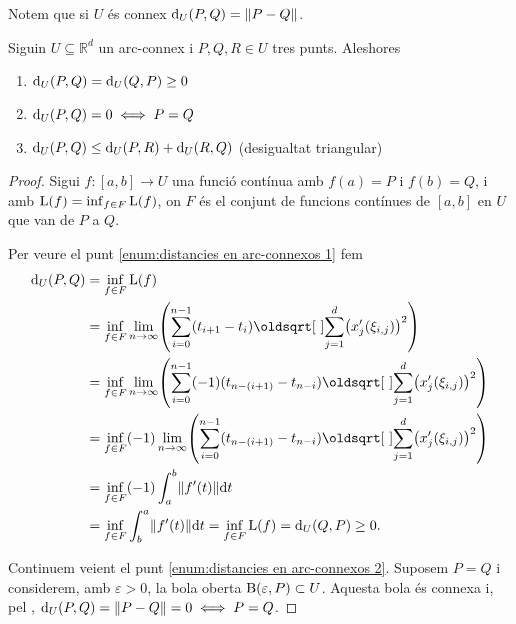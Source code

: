 \documentclass[../Apunts.tex]{subfiles}
\begin{document}
	\begin{observation}\label{obs:connex metrica}
		Notem que si \(U\) és connex \(\Dist_{U}(P,Q)=\norm{P-Q}\).
	\end{observation}
	\begin{proposition}
		Siguin \(U\subseteq\mathbb{R}^{d}\) un arc-connex i \(P,Q,R\in U\) tres punts. Aleshores
		\begin{enumerate}
			\item\label{enum:distancies en arc-connexos 1} \(\operatorname{d}_{U}(P,Q)=\operatorname{d}_{U}(Q,P)\geq0\)
			\item\label{enum:distancies en arc-connexos 2} \(\operatorname{d}_{U}(P,Q)=0\iff P=Q\)
			\item\label{enum:distancies en arc-connexos 3} \(\operatorname{d}_{U}(P,Q)\leq \operatorname{d}_{U}(P,R)+\operatorname{d}_{U}(R,Q)\) (desigualtat triangular) %
		\end{enumerate}
		\begin{proof}
			Sigui \(f\colon[a,b]\to U\) una funció contínua amb \(f(a)=P\) i \(f(b)=Q\), i  amb \(\operatorname{L}(f)=\inf_{f\in F}\operatorname{L}(f)\), on \(F\) és el conjunt de funcions contínues de \([a,b]\) en \(U\) que van de \(P\) a \(Q\). %
			
			Per veure el punt \eqref{enum:distancies en arc-connexos 1} fem
			\begin{align*}
			\Dist_{U}(P,Q)&=\inf_{f\in F}\Long(f)\\
			&=\inf_{f\in F}\lim_{n\to\infty}\left(\sum_{i=0}^{n-1}(t_{i+1}-t_{i})\sqrt{\sum_{j=1}^{d}\left(x_{j}'(\xi_{i,j})\right)^2}\right)\\
			&=\inf_{f\in F}\lim_{n\to\infty}\left(\sum_{i=0}^{n-1}(-1)(t_{n-(i+1)}-t_{n-i})\sqrt{\sum_{j=1}^{d}\left(x_{j}'(\xi_{i,j})\right)^2}\right)\\
			&=\inf_{f\in F}(-1)\lim_{n\to\infty}\left(\sum_{i=0}^{n-1}(t_{n-(i+1)}-t_{n-i})\sqrt{\sum_{j=1}^{d}\left(x_{j}'(\xi_{i,j})\right)^2}\right)\\
			&=\inf_{f\in F}(-1)\int_{a}^{b}\norm{f'(t)}\diff t\\
			&=\inf_{f\in F}\int_{b}^{a}\norm{f'(t)}\diff t=\inf_{f\in F}\Long(f)=\Dist_{U}(Q,P)\geq0.
			\end{align*}
			
			Continuem veient el punt \eqref{enum:distancies en arc-connexos 2}. Suposem \(P=Q\) i considerem, amb \(\varepsilon>0\), la bola oberta \(\operatorname{B}(\varepsilon,P)\subset U\). Aquesta bola és connexa i, pel \corollari{} , \(\Dist_{U}(P,Q)=\norm{P-Q}=0\sii P=Q\).%
			

\end{proof}
\end{proposition}
\end{document}
